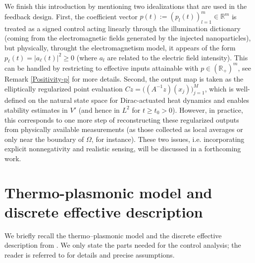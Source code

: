 \documentclass[11pt,a4paper]{article}
\numberwithin{equation}{section}
\theoremstyle{definition}
\newcommand{\1}{\mathbbm{1}}
\begin{document}
\noindent We finish this introduction by mentioning two idealizations that are used in the feedback design. First, the coefficient vector $p(t):=(p_l(t))^m_{l=1}\in\mathbb{R}^m$ is treated as a signed control acting linearly through the illumination dictionary (coming from the electromagnetic fields generated by the injected nanoparticles), but physically, throught the electromagnetism model, it appears of the form $p_\ell(t)=|a_\ell(t)|^2\ge 0$ (where $a_l$ are related to the electric field intensity).
This can be handled by restricting to effective inputs attainable with $p\in (\mathbb{R}_+)^m$, see Remark \ref{Positivity-p} for more details.
Second, the output map is taken as the elliptically regularized point evaluation $Cz=\big((A^{-1}z)(x_j)\big)_{j=1}^M$, which is well-defined on the natural state space for Dirac-actuated heat dynamics and enables stability estimates in $V'$ (and hence in $L^2$ for $t\ge t_0>0$).
However, in practice, this corresponds to one more step of reconstructing these regularized outputs from physically available measurements (as those collected as local averages or only near the boundary of $\Omega$, for instance). These two issues, i.e. incorporating explicit nonnegativity and realistic sensing, will be discussed in a forthcoming work.

 

\section{Thermo-plasmonic model and discrete effective description}
\label{sec:model}
\noindent
We briefly recall the thermo--plasmonic model and the discrete effective
description from \cite{CaoMukherjeeSini2025}. We only state the parts needed
for the control analysis; the reader is referred to
\cite{CaoMukherjeeSini2025} for details and precise assumptions.
\end{document}
